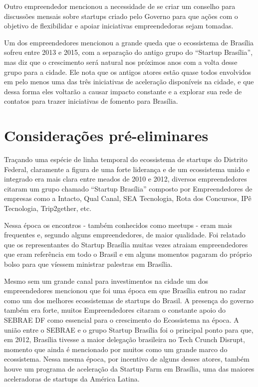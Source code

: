 Outro empreendedor mencionou a necessidade de se criar um conselho para discussões mensais sobre startups criado pelo Governo para que ações com o objetivo de flexibilidar e apoiar iniciativas empreendedoras sejam tomadas.

Um dos empreendedores mencionou a grande queda que o ecossistema de Brasília sofreu entre 2013 e 2015, com a separação do antigo grupo do ``Startup Brasília'', mas diz que o crescimento será natural nos próximos anos com a volta desse grupo para a cidade. Ele nota que os antigos atores estão quase todos envolvidos em pelo menos uma das três iniciativas de aceleração disponíveis na cidade, e que dessa forma eles voltarão a causar impacto constante e a explorar sua rede de contatos para trazer iniciativas de fomento para Brasília.

\section{Considerações pré-eliminares}
\label{consideracoes_pre_eliminares}

Traçando uma espécie de linha temporal do ecossistema de startups do Distrito Federal, claramente a figura de uma forte liderança e de um ecossistema unido e integrado era mais clara entre meados de 2010 e 2012, diversos empreendedores citaram um grupo chamado ``Startup Brasília'' composto por Empreendedores de empresas como a Intacto, Qual Canal, SEA Tecnologia, Rota dos Concursos, IPê Tecnologia, Trip2gether, etc. 

Nessa época os encontros - também conhecidos como meetups - eram mais frequentes e, segundo alguns empreendedores, de maior qualidade. Foi relatado que os representantes do Startup Brasília muitas vezes atraiam empreendedores que eram referência em todo o Brasil e em alguns momentos pagaram do próprio bolso para que víessem ministrar palestras em Brasília.

Mesmo sem um grande canal para investimentos na cidade um dos empreendedores mencionou que foi uma época em que Brasília entrou no radar como um dos melhores ecossistemas de startups do Brasil. A presença do governo também era forte, muitos Empreendedores citaram o constante apoio do SEBRAE DF como essencial para o crescimento do Ecossistema na época. A união entre o SEBRAE e o grupo Startup Brasília foi o principal ponto para que, em 2012, Brasília tivesse a maior delegação brasileira no Tech Crunch Disrupt, momento que ainda é mencionado por muitos como um grande marco do ecossistema. Nessa mesma época, por incentivo de alguns desses atores, também houve um programa de aceleração da Startup Farm em Brasília, uma das maiores aceleradoras de startups da América Latina.

